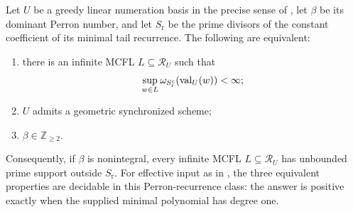 \begin{corollary}
  \label{cor:linear-perron-bounded-support-classification}
  Let \(U\) be a greedy linear numeration basis in the precise sense of
  , let \(\beta\) be its dominant
  Perron number, and let \(S_{\mathrm r}\) be the prime divisors of the
  constant coefficient of its minimal tail recurrence.  The following are
  equivalent:
  \begin{enumerate}[label=\textup{(\roman*)}]
    \item there is an infinite MCFL \(L\subseteq\mathcal R_U\) such that
    \[
      \sup_{w\in L}\omega_{S_{\mathrm r}^c}(\operatorname{val}_U(w))<\infty;
    \]
    \item \(U\) admits a geometric synchronized scheme;
    \item \(\beta\in\mathbb Z_{\ge2}\).
  \end{enumerate}
  Consequently, if \(\beta\) is nonintegral, every infinite MCFL
  \(L\subseteq\mathcal R_U\) has unbounded prime support outside
  \(S_{\mathrm r}\).  For effective input as in
  , the three equivalent
  properties are decidable in this Perron-recurrence class: the answer is positive
  exactly when the supplied minimal polynomial has degree one.
\end{corollary}

